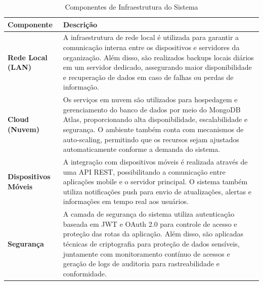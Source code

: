 \documentclass[11pt,a4paper]{article}
\begin{document}
\begin{table}[H]
\centering
\caption{Componentes de Infraestrutura do Sistema}
\label{tab:infrastructure}

\renewcommand{\arraystretch}{1.5}

\begin{tabular}{|>{\centering\arraybackslash}m{4cm}|m{10cm}|}
\hline

\rowcolor[HTML]{D9EAF7}
\textbf{Componente} & \textbf{Descrição} \\

\hline

\textbf{Rede Local (LAN)} & 
A infraestrutura de rede local é utilizada para garantir a comunicação interna entre os dispositivos e servidores da organização. Além disso, são realizados backups locais diários em um servidor dedicado, assegurando maior disponibilidade e recuperação de dados em caso de falhas ou perdas de informação. \\

\hline

\textbf{Cloud (Nuvem)} & 
Os serviços em nuvem são utilizados para hospedagem e gerenciamento do banco de dados por meio do MongoDB Atlas, proporcionando alta disponibilidade, escalabilidade e segurança. O ambiente também conta com mecanismos de auto-scaling, permitindo que os recursos sejam ajustados automaticamente conforme a demanda do sistema. \\

\hline

\textbf{Dispositivos Móveis} & 
A integração com dispositivos móveis é realizada através de uma API REST, possibilitando a comunicação entre aplicações mobile e o servidor principal. O sistema também utiliza notificações push para envio de atualizações, alertas e informações em tempo real aos usuários. \\

\hline

\textbf{Segurança} & 
A camada de segurança do sistema utiliza autenticação baseada em JWT e OAuth 2.0 para controle de acesso e proteção das rotas da aplicação. Além disso, são aplicadas técnicas de criptografia para proteção de dados sensíveis, juntamente com monitoramento contínuo de acessos e geração de logs de auditoria para rastreabilidade e conformidade. \\

\hline

\end{tabular}
\end{table}
\end{document}
